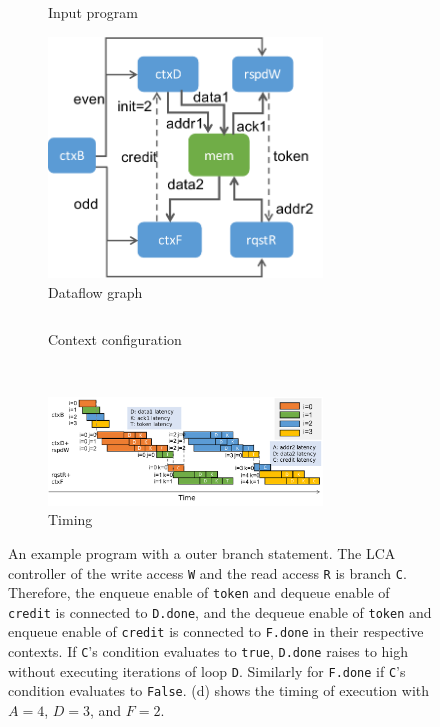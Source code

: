 \begin{figure}
\centering
  \vspace{-1cm}
\begin{subfigure}[b]{0.45\textwidth}
\inputminted{python}{code/branch.py}
\caption{Input program}
  \vspace{0.2cm}
\includegraphics[width=0.8\textwidth]{figs/branchctx.pdf}
\caption{Dataflow graph}
\end{subfigure}
\hfill
\begin{subfigure}[b]{0.48\textwidth}
\inputminted{python}{code/branchctx.py}
\caption{Context configuration}
\end{subfigure}
\\
  \vspace{0.2cm}
\begin{subfigure}[b]{\textwidth}
  \centering
\includegraphics[width=0.8\textwidth]{figs/branchtiming.pdf}
\caption{Timing}
\end{subfigure}
\caption[Branching example]{
  An example program with a outer branch statement. 
  The LCA controller of the write access \texttt{W} and the read access \texttt{R} is branch \texttt{C}.
  Therefore, the enqueue enable of \texttt{token} and dequeue enable of \texttt{credit} is connected to
  \texttt{D.done}, and the dequeue enable of \texttt{token} and enqueue enable of \texttt{credit} is
  connected to \texttt{F.done} in their respective contexts.
  If \texttt{C}'s condition evaluates to \texttt{true}, \texttt{D.done} raises to high without executing
  iterations of loop \texttt{D}. Similarly for \texttt{F.done} if \texttt{C}'s condition evaluates to
  \texttt{False}.
  (d) shows the timing of execution with $A=4$, $D=3$, and $F=2$.
}
\label{fig:branch} 
\end{figure}

